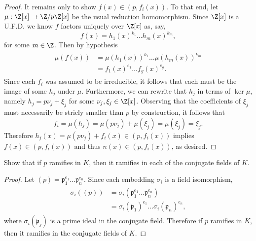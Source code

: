 \documentclass[10pt]{amsart}
\begin{document}
\begin{thm}
\begin{proof}
  It remains only to show $f(x) \in (p, f_i(x))$.
  To that end, let $\mu: \Z[x] \rightarrow \Z/p\Z[x]$ be the usual reduction homomorphism.
  Since $\Z[x]$ is a U.F.D. we know $f$ factors uniquely over $\Z[x]$ as, say, $$f(x) = h_1(x)^{k_1}\ldots h_m(x)^{k_m},$$
  for some $m \in \Z$.
  Then by hypothesis
  \begin{align*}
    \begin{split}
      \mu(f(x)) &= \mu(h_1(x))^{k_1}\ldots \mu(h_m(x))^{k_m} \\
      &= f_1(x)^{e_1}\ldots f_g(x)^{e_g}.
    \end{split}
  \end{align*}
  Since each $f_i$ was assumed to be irreducible, it follows that each must be the image of some $h_j$ under $\mu$.
  Furthermore, we can rewrite that $h_j$ in terms of $\ker{\mu}$, namely $h_j = p\nu_j + \xi_j$ for some $\nu_j, \xi_j \in \Z[x]$.
  Observing that the coefficients of $\xi_j$ must necessarily be stricly smaller than $p$ by construction, it follows that 
  $$f_i = \mu(h_j) = \mu(p\nu_j) +\mu(\xi_j) = \mu(\xi_j) = \xi_j.$$
  Therefore $h_j(x) = \mu(p\nu_j) + f_i(x) \in (p, f_i(x))$ implies $f(x) \in (p,f_i(x))$ and thus $n(x) \in (p, f_i(x))$, as desired.
\end{proof}
\end{thm}

\begin{thm}
  \newcommand{\pp}{\mathfrak{p}}
  \label{Ex2}
  Show that if $p$ ramifies in $K$, then it ramifies in each of the conjugate fields of $K$.
  \begin{proof}
    Let $(p) = \pp_1^{e_1}\ldots\pp_n^{e_n}.$
    Since each embedding $\sigma_i$ is a field isomorphism, 
    \begin{align*}
      \begin{split}
        \sigma_i((p)) &= \sigma_i(\pp_1^{e_1}\ldots\pp_n^{e_n})\\
        &= \sigma_i(\pp_1)^{e_1}\ldots\sigma_i(\pp_n)^{e_n},
        \end{split}
      \end{align*}
      where $\sigma_i(\pp_j)$ is a prime ideal in the conjugate field.
      Therefore if $p$ ramifies in $K$, then it ramifies in the conjugate fields of $K$.
  \end{proof}
\end{thm}
\end{document}
